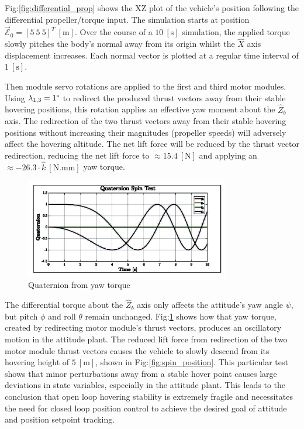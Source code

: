 \par
Fig:\ref{fig:differential_prop} shows the XZ plot of the vehicle's position following the differential propeller/torque input. The simulation starts at position $\vec{\mathcal{E}}_0=[5~5~5]^T~[\text{m}]$. Over the course of a $10~[\text{s}]$ simulation, the applied torque slowly pitches the body's normal away from its origin whilst the $\hat{X}$ axis displacement increases. Each normal vector is plotted at a regular time interval of $1~[\text{s}]$. 
\par
Then module servo rotations are applied to the first and third motor modules. Using $\lambda_{1,3}=1\text{\textdegree}$ to redirect the produced thrust vectors away from their stable hovering positions, this rotation applies an effective yaw moment about the $\hat{Z}_b$ axis. The redirection of the two thrust vectors away from their stable hovering positions without increasing their magnitudes (propeller speeds) will adversely affect the hovering altitude. The net lift force will be reduced by the thrust vector redirection, reducing the net lift force to $\approx 15.4~[\text{N}]$ and applying an $\approx-26.3\cdot\hat{k}~[\text{N.mm}]$ yaw torque.
\begin{figure}[hbtp]
\vspace{-8pt}
\centering
\includegraphics[width=0.8\textwidth]{graphs/spin_quaternion}
\vspace{-6pt}
\caption{Quaternion from yaw torque}
\vspace{-10pt}
\label{fig:spin}
\end{figure}
\par
The differential torque about the $\hat{Z}_b$ axis only affects the attitude's yaw angle $\psi$, but pitch $\phi$ and roll $\theta$ remain unchanged. Fig:\ref{fig:spin} shows how that yaw torque, created by redirecting motor module's thrust vectors, produces an oscillatory motion in the attitude plant. The reduced lift force from redirection of the two motor module thrust vectors causes the vehicle to slowly descend from its hovering height of $5~[\text{m}]$, shown in Fig:\ref{fig:spin_position}. This particular test shows that minor perturbations away from a stable hover point causes large deviations in state variables, especially in the attitude plant. This leads to the conclusion that open loop hovering stability is extremely fragile and necessitates the need for closed loop position control to achieve the desired goal of attitude and position setpoint tracking.
